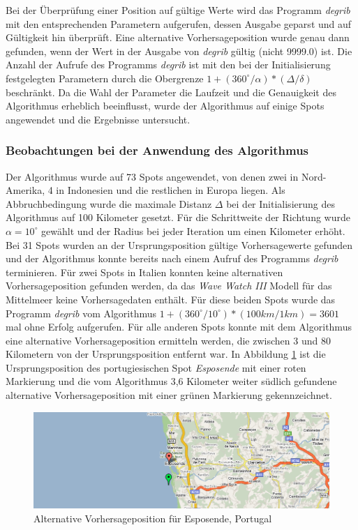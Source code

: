 Bei der Überprüfung einer Position auf gültige Werte wird das Programm
\textit{degrib} mit den entsprechenden Parametern aufgerufen, dessen
Ausgabe geparst und auf Gültigkeit hin überprüft. Eine alternative
Vorhersageposition wurde genau dann gefunden, wenn der Wert in der
Ausgabe von \textit{degrib} gültig (nicht 9999.0) ist. Die Anzahl der
Aufrufe des Programms \textit{degrib} ist mit den bei der
Initialisierung festgelegten Parametern durch die Obergrenze $1 +
(360^{\circ} / \alpha) * (\Delta / \delta)$ beschränkt. Da die Wahl
der Parameter die Laufzeit und die Genauigkeit des Algorithmus
erheblich beeinflusst, wurde der Algorithmus auf einige Spots
angewendet und die Ergebnisse untersucht.

\subsubsection{Beobachtungen bei der Anwendung des Algorithmus}
Der Algorithmus wurde auf 73 Spots angewendet, von denen zwei in
Nord-Amerika, 4 in Indonesien und die restlichen in Europa liegen. Als
Abbruchbedingung wurde die maximale Distanz $\Delta$ bei der
Initialisierung des Algorithmus auf 100 Kilometer gesetzt. Für die
Schrittweite der Richtung wurde $\alpha = 10^{\circ}$ gewählt und der
Radius bei jeder Iteration um einen Kilometer erhöht. Bei 31 Spots
wurden an der Ursprungsposition gültige Vorhersagewerte gefunden und
der Algorithmus konnte bereits nach einem Aufruf des Programms
\textit{degrib} terminieren. Für zwei Spots in Italien konnten keine
alternativen Vorhersageposition gefunden werden, da das \textit{Wave
  Watch III} Modell für das Mittelmeer keine Vorhersagedaten
enthält. Für diese beiden Spots wurde das Programm \textit{degrib} vom
Algorithmus $1 + (360^{\circ} / 10^{\circ}) * (100km / 1km) = 3601$
mal ohne Erfolg aufgerufen. Für alle anderen Spots konnte mit dem
Algorithmus eine alternative Vorhersageposition ermitteln werden, die
zwischen 3 und 80 Kilometern von der Ursprungsposition entfernt
war. In Abbildung \ref{locate-esposende} ist die Ursprungsposition des
portugiesischen Spot \textit{Esposende} mit einer roten Markierung und
die vom Algorithmus 3,6 Kilometer weiter südlich gefundene alternative
Vorhersageposition mit einer grünen Markierung gekennzeichnet.

\begin{figure}[h]
  \begin{center}
    \includegraphics[width=\textwidth]{bilder/locate-esposende}
    \caption{Alternative Vorhersageposition für Esposende, Portugal}
    \label{locate-esposende}
  \end{center}
\end{figure}

